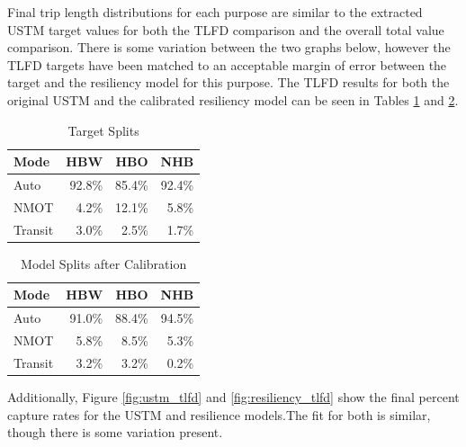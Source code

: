 Final trip length distributions for each purpose are similar to the
extracted USTM target values for both the TLFD comparison and the overall
total value comparison. There is some variation between the two graphs
below, however the TLFD targets have been matched to an acceptable margin
of error between the target and the resiliency model for this purpose. The
TLFD results for both the original USTM and the calibrated resiliency
model can be seen in Tables \ref{tab:ustmsplit} and \ref{tab:modelsplit}.

\begin{table}

\caption{\label{tab:ustmsplit}Target Splits}
\centering
\begin{tabular}[t]{lrrr}
\toprule
Mode & HBW & HBO & NHB\\
\midrule
Auto & 92.8\% & 85.4\% & 92.4\%\\
NMOT & 4.2\% & 12.1\% & 5.8\%\\
Transit & 3.0\% & 2.5\% & 1.7\%\\
\bottomrule
\end{tabular}
\end{table}

\begin{table}

\caption{\label{tab:modelsplit}Model Splits after Calibration}
\centering
\begin{tabular}[t]{lrrr}
\toprule
Mode & HBW & HBO & NHB\\
\midrule
Auto & 91.0\% & 88.4\% & 94.5\%\\
NMOT & 5.8\% & 8.5\% & 5.3\%\\
Transit & 3.2\% & 3.2\% & 0.2\%\\
\bottomrule
\end{tabular}
\end{table}

Additionally, Figure \ref{fig:ustm_tlfd} and \ref{fig:resiliency_tlfd} show the final percent capture rates for the USTM and resilience models.The fit for both is similar, though there is some variation present.

